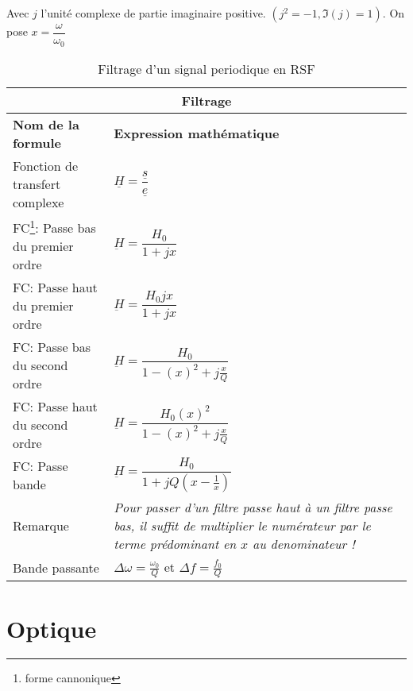 \documentclass[10pt,a4paper,titlepage,portrait]{article}
\renewcommand{\arraystretch}{2}
\begin{document}
\begin{center}
\begin{table}[H]
    \centering
    Avec $j$ l'unité complexe de partie imaginaire positive. $\left(j^2 = -1, \Im(j)=1\right)$. On pose $x = \dfrac{\omega}{\omega_0}$
    \renewcommand{\arraystretch}{1.5} %
    \setlength{\tabcolsep}{8pt} %
    \begin{tabular}{@{}p{9cm}p{10cm}@{}}
        \toprule
        \multicolumn{2}{c}{\textbf{Filtrage}} \\
        \midrule
        \textbf{Nom de la formule} & \textbf{Expression mathématique} \\
        \midrule
        Fonction de transfert complexe & $\underline{H} = \dfrac{\underline{s}}{\underline{e}}$ \\
        FC\footnote{forme cannonique}: Passe bas du premier ordre & $\underbar{H} = \dfrac{H_0}{1+jx}$ \\
        FC: Passe haut du premier ordre & $\underbar{H} = \dfrac{H_0jx}{1+jx}$ \\ 
        FC: Passe bas du second ordre & $\underbar{H} = \dfrac{H_0}{1-\left(x\right)^2 + j\frac{x}{Q}}$ \\
        FC: Passe haut du second ordre & $\underbar{H} = \dfrac{H_0\left(x\right)^2}{1-\left(x\right)^2 + j\frac{x}{Q}}$ \\
        FC: Passe bande & $\underbar{H} = \dfrac{H_0}{1+jQ\left(x-\frac{1}{x}\right)}$ \\ 
        Remarque & \textit{Pour passer d'un filtre passe haut à un filtre passe bas, il suffit de multiplier le numérateur par le terme prédominant en $x$ au denominateur !} \\ 
        Bande passante & $\Delta\omega = \frac{\omega_0}{Q}$ et $\Delta f=\frac{f_0}{Q}$\\
    \bottomrule
\end{tabular}
\caption{Filtrage d'un signal periodique en RSF}
\label{tab:filtrage}
\end{table}



\section{Optique}



\end{center}
\end{document}
